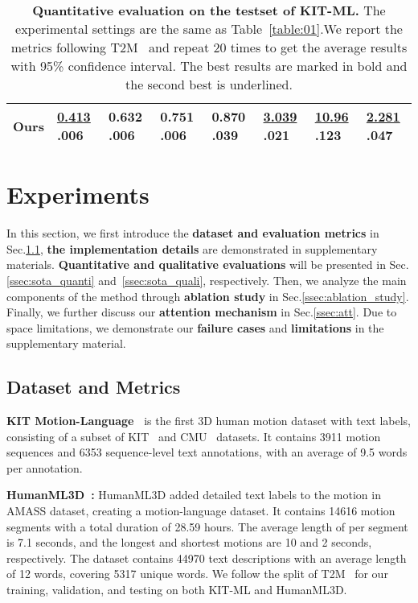 \documentclass[10pt,twocolumn,letterpaper]{article}
\begin{document}
\begin{table*}[ht]
\begin{center}
\begin{tabular}{p{2.15cm}p{1.70cm}p{1.70cm}p{1.70cm}p{1.70cm}p{1.70cm}p{1.70cm}p{1.70cm}}
\hline

Ours& \underline{0.413} \tiny  .006& \textbf{0.632}  \tiny  .006& \textbf{0.751}  \tiny  .006& 0.870  \tiny  .039&\underline{3.039}  \tiny  .021 &\underline{10.96} \tiny  .123 &\underline{2.281} \tiny  .047\\
\hline
\end{tabular}
\end{center}
\caption{\textbf{Quantitative evaluation on the testset of KIT-ML.} The experimental settings are the same as Table~\ref{table:01}.We report the metrics following T2M~\cite{guo2022generating} and repeat 20 times to get the average results with 95\% confidence interval. The best results are marked in bold and the second best is underlined.}
\label{table:02}
\end{table*}

\section{Experiments}
In this section, we first introduce the \textbf{dataset and evaluation metrics} in Sec.\ref{ssec:dataset}, \textbf{the implementation details} are demonstrated in supplementary materials. \textbf{Quantitative and qualitative evaluations} will be presented in Sec.\ref{ssec:sota_quanti} and~\ref{ssec:sota_quali}, respectively. Then, we analyze the main components of the method through \textbf{ablation study} in Sec.\ref{ssec:ablation_study}. Finally, we further discuss our \textbf{attention mechanism} in Sec.\ref{ssec:att}. Due to space limitations, we demonstrate our \textbf{failure cases} and \textbf{limitations} in the supplementary material.




\subsection{Dataset and Metrics}\label{ssec:dataset}
\textbf{KIT Motion-Language~\cite{plappert2016kit}} is the first 3D human motion dataset with text labels, consisting of a subset of KIT~\cite{Mandery2015a} and CMU~\cite{cmu} datasets. It contains 3911 motion sequences and 6353 sequence-level text annotations, with an average of 9.5 words per annotation. 

\textbf{HumanML3D~\cite{guo2022generating}:} HumanML3D added detailed text labels to the motion in AMASS dataset, creating a motion-language dataset. It contains 14616 motion segments with a total duration of 28.59 hours. The average length of per segment is 7.1 seconds, and the longest and shortest motions are 10 and 2 seconds, respectively. The dataset contains 44970 text descriptions with an average length of 12 words, covering 5317 unique words. We follow the split of T2M~\cite{guo2022generating} for our training, validation, and testing on both KIT-ML and HumanML3D.
\end{document}
